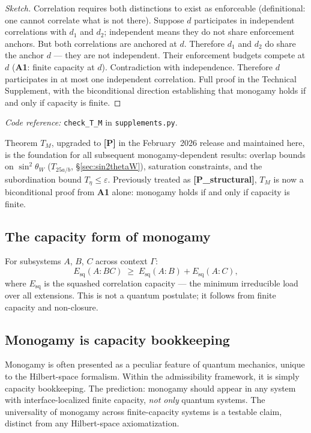 \documentclass[11pt]{article}
\newcommand{\coderef}[2]{\smallskip\noindent\textit{Code reference:} \texttt{#1} in \texttt{#2}.}
\newcommand{\epitag}[1]{\textbf{[#1]}}
\newcommand{\Aone}{\textbf{A1}}
\theoremstyle{definition}
\begin{document}
\begin{proof}[Sketch]
Correlation requires both distinctions to exist as enforceable (definitional: one cannot correlate what is not there). Suppose $d$ participates in independent correlations with $d_1$ and $d_2$; independent means they do not share enforcement anchors. But both correlations are anchored at $d$. Therefore $d_1$ and $d_2$ do share the anchor $d$ --- they are not independent. Their enforcement budgets compete at $d$ (\Aone{}: finite capacity at $d$). Contradiction with independence. Therefore $d$ participates in at most one independent correlation. Full proof in the Technical Supplement, with the biconditional direction establishing that monogamy holds if and only if capacity is finite.
\end{proof}

\coderef{check\_T\_M}{supplements.py}

Theorem $T_M$, upgraded to \epitag{P} in the February~2026 release and maintained here, is the foundation for all subsequent monogamy-dependent results: overlap bounds on $\sin^2\theta_W$ ($T_{25a/b}$, \S\ref{sec:sin2thetaW}), saturation constraints, and the subordination bound $T_\eta \leq \varepsilon$. Previously treated as \epitag{P\_structural}, $T_M$ is now a biconditional proof from \Aone{} alone: monogamy holds if and only if capacity is finite.

\subsection{The capacity form of monogamy}\label{sec:monogamy_capacity_form}

\begin{tcolorbox}[apfbox, title={Theorem 3.1 (Monogamy inequality) \epitag{P}}]
For subsystems $A$, $B$, $C$ across context $\Gamma$:
\[
E_{\mathrm{sq}}(A : BC) \;\geq\; E_{\mathrm{sq}}(A : B) + E_{\mathrm{sq}}(A : C),
\]
where $E_{\mathrm{sq}}$ is the squashed correlation capacity --- the minimum irreducible load over all extensions. This is not a quantum postulate; it follows from finite capacity and non-closure.
\end{tcolorbox}

\subsection{Monogamy is capacity bookkeeping}\label{sec:monogamy_is_bookkeeping}

Monogamy is often presented as a peculiar feature of quantum mechanics, unique to the Hilbert-space formalism. Within the admissibility framework, it is simply capacity bookkeeping. The prediction: monogamy should appear in any system with interface-localized finite capacity, \emph{not only} quantum systems. The universality of monogamy across finite-capacity systems is a testable claim, distinct from any Hilbert-space axiomatization.
\end{document}
